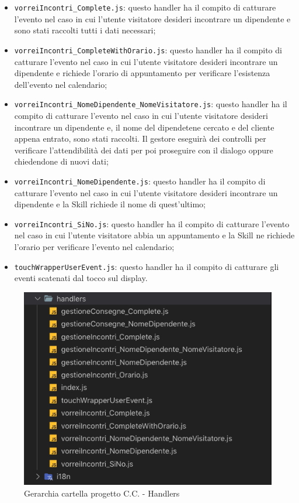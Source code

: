 \begin{itemize}
    \item \texttt{vorreiIncontri\_Complete.js}: questo handler ha il compito di catturare l'evento nel caso in cui l'utente visitatore desideri incontrare un dipendente e sono stati raccolti tutti i dati necessari;
    \item \texttt{vorreiIncontri\_CompleteWithOrario.js}: questo handler ha il compito di catturare l'evento nel caso in cui l'utente visitatore desideri incontrare un dipendente e richiede l'orario di appuntamento per verificare l'esistenza dell'evento nel calendario;
    \item \texttt{vorreiIncontri\_NomeDipendente\_NomeVisitatore.js}: questo handler ha il compito di catturare l'evento nel caso in cui l'utente visitatore desideri incontrare un dipendente e, il nome del dipendetene cercato e del cliente appena entrato, sono stati raccolti. Il gestore eseguirà dei controlli per verificare l'attendibilità dei dati per poi proseguire con il dialogo oppure chiedendone di nuovi dati;
    \item \texttt{vorreiIncontri\_NomeDipendente.js}: questo handler ha il compito di catturare l'evento nel caso in cui l'utente visitatore desideri incontrare un dipendente e la Skill richiede il nome di quest'ultimo;
    \item \texttt{vorreiIncontri\_SiNo.js}: questo handler ha il compito di catturare l'evento nel caso in cui l'utente visitatore abbia un appuntamento e la Skill ne richiede l'orario per verificare l'evento nel calendario;
    \item \texttt{touchWrapperUserEvent.js}: questo handler ha il compito di catturare gli eventi scatenati dal tocco sul display.
\end{itemize}
\begin{figure}[H]
	\includegraphics[width=13cm]{immagini/skill-folder2.png}
	\caption{\label{fig:gerarchia_cartella_cc2}Gerarchia cartella progetto C.C. - Handlers}
\end{figure}
